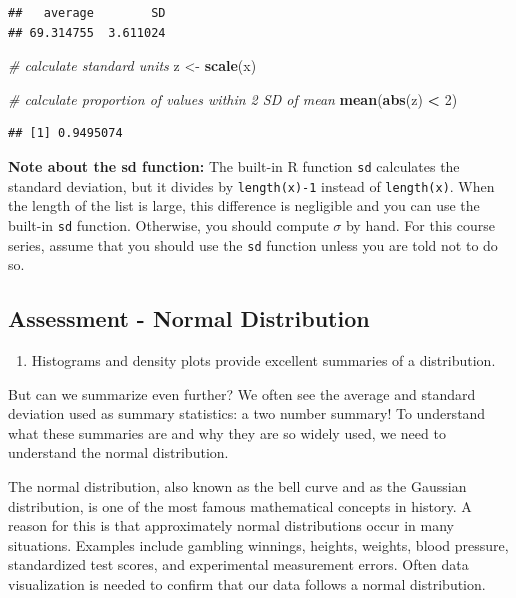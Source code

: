 \documentclass[
]{article}
\newenvironment{Shaded}{\begin{snugshade}}{\end{snugshade}}
\newcommand{\CommentTok}[1]{\textcolor[rgb]{0.56,0.35,0.01}{\textit{#1}}}
\newcommand{\DecValTok}[1]{\textcolor[rgb]{0.00,0.00,0.81}{#1}}
\newcommand{\KeywordTok}[1]{\textcolor[rgb]{0.13,0.29,0.53}{\textbf{#1}}}
\newcommand{\NormalTok}[1]{#1}
\newcommand{\OperatorTok}[1]{\textcolor[rgb]{0.81,0.36,0.00}{\textbf{#1}}}
\newcommand{\StringTok}[1]{\textcolor[rgb]{0.31,0.60,0.02}{#1}}
\providecommand{\tightlist}{%
  \setlength{\itemsep}{0pt}\setlength{\parskip}{0pt}}
\begin{document}
\begin{verbatim}
##   average        SD 
## 69.314755  3.611024
\end{verbatim}

\begin{Shaded}
\begin{Highlighting}[]
\CommentTok{# calculate standard units}
\NormalTok{z <-}\StringTok{ }\KeywordTok{scale}\NormalTok{(x)}

\CommentTok{# calculate proportion of values within 2 SD of mean}
\KeywordTok{mean}\NormalTok{(}\KeywordTok{abs}\NormalTok{(z) }\OperatorTok{<}\StringTok{ }\DecValTok{2}\NormalTok{)}
\end{Highlighting}
\end{Shaded}

\begin{verbatim}
## [1] 0.9495074
\end{verbatim}

\textbf{Note about the sd function:} The built-in R function \texttt{sd}
calculates the standard deviation, but it divides by
\texttt{length(x)-1} instead of \texttt{length(x)}. When the length of
the list is large, this difference is negligible and you can use the
built-in \texttt{sd} function. Otherwise, you should compute \(\sigma\)
by hand. For this course series, assume that you should use the
\texttt{sd} function unless you are told not to do so.

\hypertarget{assessment---normal-distribution}{%
\subsection{Assessment - Normal
Distribution}\label{assessment---normal-distribution}}

\begin{enumerate}
\def\labelenumi{\arabic{enumi}.}
\tightlist
\item
  Histograms and density plots provide excellent summaries of a
  distribution.
\end{enumerate}

But can we summarize even further? We often see the average and standard
deviation used as summary statistics: a two number summary! To
understand what these summaries are and why they are so widely used, we
need to understand the normal distribution.

The normal distribution, also known as the bell curve and as the
Gaussian distribution, is one of the most famous mathematical concepts
in history. A reason for this is that approximately normal distributions
occur in many situations. Examples include gambling winnings, heights,
weights, blood pressure, standardized test scores, and experimental
measurement errors. Often data visualization is needed to confirm that
our data follows a normal distribution.
\end{document}
